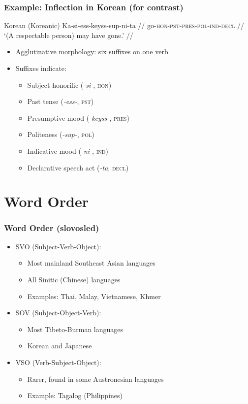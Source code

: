 \documentclass{beamer}
\begin{document}
\begin{frame}
\frametitle{Example: Inflection in Korean (for contrast)}
\begin{exampleblock}{Korean (Koreanic)}
  \ex
\begingl
\gla Ka-si-ess-keyss-sup-ni-ta //
\glb go-\textsc{hon}-\textsc{pst}-\textsc{pres}-\textsc{pol}-\textsc{ind}-\textsc{decl} //
\glft `(A respectable person) may have gone.' //
\endgl
\xe
\end{exampleblock}
\begin{itemize}
\item Agglutinative morphology: six suffixes on one verb
\item Suffixes indicate:
  \begin{itemize}
  \item Subject honorific (\emph{-si-}, \textsc{hon})
  \item Past tense (\emph{-ess-}, \textsc{pst})
  \item Presumptive mood (\emph{-keyss-}, \textsc{pres})
  \item Politeness (\emph{-sup-}, \textsc{pol})
  \item Indicative mood (\emph{-ni-}, \textsc{ind})
  \item Declarative speech act (\emph{-ta}, \textsc{decl})
  \end{itemize}
\end{itemize}
\end{frame}

\section{Word Order}

\begin{frame}
\frametitle{Word Order (slovosled)}
\begin{itemize}
\item SVO (Subject-Verb-Object):
  \begin{itemize}
  \item Most mainland Southeast Asian languages
  \item All Sinitic (Chinese) languages
  \item Examples: Thai, Malay, Vietnamese, Khmer
  \end{itemize}
\item SOV (Subject-Object-Verb):
  \begin{itemize}
  \item Most Tibeto-Burman languages
  \item Korean and Japanese
  \end{itemize}
\item VSO (Verb-Subject-Object):
  \begin{itemize}
  \item Rarer, found in some Austronesian languages
  \item Example: Tagalog (Philippines)
  \end{itemize}
\end{itemize}
\end{frame}
\end{document}
